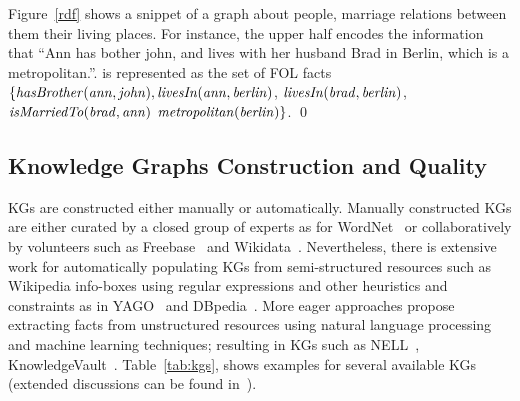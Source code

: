 \begin{example} Figure~\ref{rdf} shows a snippet of a graph about people, marriage %
relations between them %
their %
living places. For instance, the upper half encodes the information that ``Ann has bother john, and lives with her husband Brad in Berlin, which is a metropolitan.''. 
is %
represented as the set of FOL facts $\mathit{\{hasBrother(ann, john), livesIn(ann, berlin)}$, $\mathit{livesIn(brad, berlin)}$,\\ $\mathit{isMarriedTo(brad, ann)}$
$\mathit{metropolitan(berlin)}\}$.  \qed
\end{example}






\subsection{Knowledge Graphs Construction and Quality}

KGs are constructed either manually or automatically. Manually constructed KGs are either curated by a closed group of experts as for WordNet~\cite{wordnet} or collaboratively by volunteers such as \eg Freebase~\cite{Freebase} and Wikidata~\cite{wikidata}.  Nevertheless, there is extensive work for automatically populating KGs from semi-structured resources such as Wikipedia info-boxes using regular expressions and other heuristics and constraints as in YAGO~\cite{yago} and DBpedia~\cite{dbpedia}. More eager approaches propose extracting facts from unstructured resources using natural language processing and machine learning techniques; resulting in KGs such as  NELL~\cite{nell}, KnowledgeVault~\cite{KnowledgeVault}. Table~\ref{tab:kgs}, shows examples for several available KGs (extended discussions can be found in~\cite{Nickel2015ARO,DBLP:journals/semweb/Paulheim17}). 

